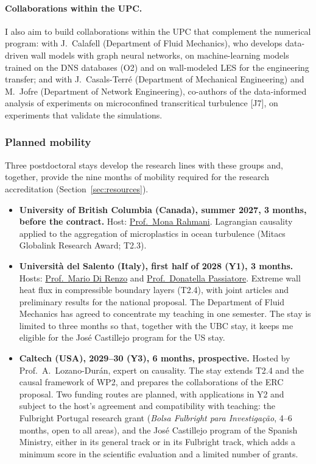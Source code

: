 \documentclass[11pt]{article}
\begin{document}
\paragraph{Collaborations within the UPC.} I also aim to build collaborations within the UPC that
complement the numerical program: with J.\ Calafell (Department of Fluid Mechanics), who develops
data-driven wall models with graph neural networks, on machine-learning models trained on the DNS
databases (O2) and on wall-modeled LES for the engineering transfer; and with J.\ Casals-Terr\'e
(Department of Mechanical Engineering) and M.\ Jofre (Department of Network Engineering), co-authors
of the data-informed analysis of experiments on microconfined transcritical turbulence [J7], on
experiments that validate the simulations.

\subsubsection*{Planned mobility}
Three postdoctoral stays develop the research lines with these groups and, together, provide the
nine months of mobility required for the research accreditation (Section~\ref{sec:resources}).
\begin{itemize}
  \item \textbf{University of British Columbia (Canada), summer 2027, 3 months, before the
  contract.} Host: \href{https://chbe.ubc.ca/mona-rahmani/}{Prof.\ Mona Rahmani}. Lagrangian
  causality applied to the aggregation of microplastics in ocean turbulence (Mitacs Globalink
  Research Award; T2.3).
  
  \item \textbf{Universit\`a del Salento (Italy), first half of 2028 (Y1), 3 months.} Hosts:
  \href{https://www.unisalento.it/scheda-utente/-/people/mario.direnzo}{Prof.\ Mario Di Renzo}
  and \href{https://www.unisalento.it/scheda-utente/-/people/donatella.passiatore}{Prof.\
  Donatella Passiatore}. Extreme wall heat flux in compressible boundary layers (T2.4), with
  joint articles and preliminary results for the national proposal. The Department of Fluid
  Mechanics has agreed to concentrate my teaching in one semester. The stay is limited to
  three months so that, together with the UBC stay, it keeps me eligible for the José
  Castillejo program for the US stay.
  
  \item \textbf{Caltech (USA), 2029--30 (Y3), 6 months,
  prospective.} Hosted by Prof.\ A.\ Lozano-Dur\'an, expert on causality. The stay extends T2.4 and the causal framework of WP2, and prepares the collaborations of the ERC proposal. Two funding routes are planned,
  with applications in Y2 and subject to the host's agreement and compatibility with
  teaching: the Fulbright Portugal research grant (\emph{Bolsa Fulbright para
  Investiga\c{c}\~ao}, 4--6 months, open to all areas), and the José Castillejo program of the
  Spanish Ministry, either in its general track or in its Fulbright track, which adds a minimum
  score in the scientific evaluation and a limited number of grants.
\end{itemize}
\end{document}
